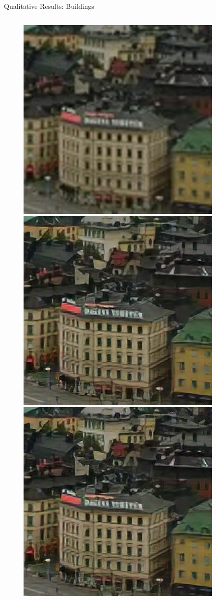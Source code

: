 \documentclass{beamer}
\begin{document}
\begin{frame}{Qualitative Results: Buildings}
\begin{figure}
  \begin{columns}
      \includegraphics[width=0.6\linewidth]{static/buildings_bilinear_interpolation.png}
      \includegraphics[width=0.6\linewidth]{static/buildings_srunet.png}
      \includegraphics[width=0.6\linewidth]{static/buildings_srunet_int8.png}
  \end{columns}

\end{figure}
\end{frame}
\end{document}
